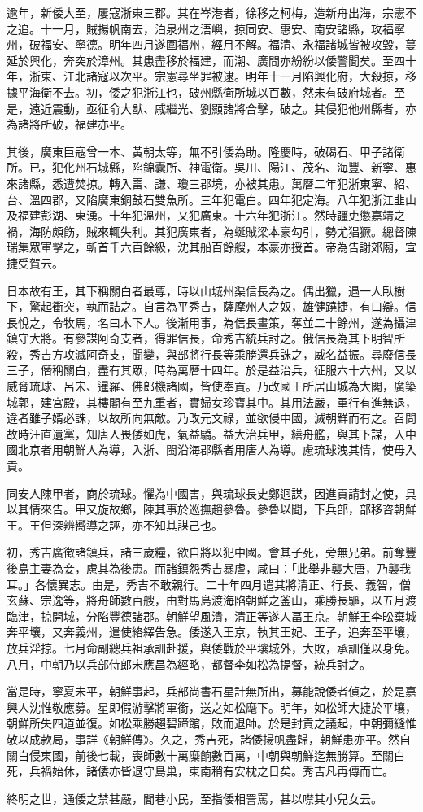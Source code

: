 \begin{pinyinscope}
逾年，新倭大至，屢寇浙東三郡。其在岑港者，徐移之柯梅，造新舟出海，宗憲不之追。十一月，賊揚帆南去，泊泉州之浯嶼，掠同安、惠安、南安諸縣，攻福寧州，破福安、寧德。明年四月遂圍福州，經月不解。福清、永福諸城皆被攻毀，蔓延於興化，奔突於漳州。其患盡移於福建，而潮、廣間亦紛紛以倭警聞矣。至四十年，浙東、江北諸寇以次平。宗憲尋坐罪被逮。明年十一月陷興化府，大殺掠，移據平海衛不去。初，倭之犯浙江也，破州縣衛所城以百數，然未有破府城者。至是，遠近震動，亟征俞大猷、戚繼光、劉顯諸將合擊，破之。其侵犯他州縣者，亦為諸將所破，福建亦平。

其後，廣東巨寇曾一本、黃朝太等，無不引倭為助。隆慶時，破碣石、甲子諸衛所。已，犯化州石城縣，陷錦囊所、神電衛。吳川、陽江、茂名、海豐、新寧、惠來諸縣，悉遭焚掠。轉入雷、謙、瓊三郡境，亦被其患。萬曆二年犯浙東寧、紹、台、溫四郡，又陷廣東銅鼓石雙魚所。三年犯電白。四年犯定海。八年犯浙江韭山及福建彭湖、東湧。十年犯溫州，又犯廣東。十六年犯浙江。然時疆吏懲嘉靖之禍，海防頗飭，賊來輒失利。其犯廣東者，為蜒賊梁本豪勾引，勢尤猖獗。總督陳瑞集眾軍擊之，斬首千六百餘級，沈其船百餘艘，本豪亦授首。帝為告謝郊廟，宣捷受賀云。

日本故有王，其下稱關白者最尊，時以山城州渠信長為之。偶出獵，遇一人臥樹下，驚起衝突，執而詰之。自言為平秀吉，薩摩州人之奴，雄健蹺捷，有口辯。信長悅之，令牧馬，名曰木下人。後漸用事，為信長畫策，奪並二十餘州，遂為攝津鎮守大將。有參謀阿奇支者，得罪信長，命秀吉統兵討之。俄信長為其下明智所殺，秀吉方攻滅阿奇支，聞變，與部將行長等乘勝還兵誅之，威名益振。尋廢信長三子，僭稱關白，盡有其眾，時為萬曆十四年。於是益治兵，征服六十六州，又以威脅琉球、呂宋、暹羅、佛郎機諸國，皆使奉貢。乃改國王所居山城為大閣，廣築城郭，建宮殿，其樓閣有至九重者，實婦女珍寶其中。其用法嚴，軍行有進無退，違者雖子婿必誅，以故所向無敵。乃改元文祿，並欲侵中國，滅朝鮮而有之。召問故時汪直遺黨，知唐人畏倭如虎，氣益驕。益大治兵甲，繕舟艦，與其下謀，入中國北京者用朝鮮人為導，入浙、閩沿海郡縣者用唐人為導。慮琉球洩其情，使毋入貢。

同安人陳甲者，商於琉球。懼為中國害，與琉球長史鄭迥謀，因進貢請封之使，具以其情來告。甲又旋故鄉，陳其事於巡撫趙參魯。參魯以聞，下兵部，部移咨朝鮮王。王但深辨嚮導之誣，亦不知其謀己也。

初，秀吉廣徵諸鎮兵，諸三歲糧，欲自將以犯中國。會其子死，旁無兄弟。前奪豐後島主妻為妾，慮其為後患。而諸鎮怨秀吉暴虐，咸曰：「此舉非襲大唐，乃襲我耳。」各懷異志。由是，秀吉不敢親行。二十年四月遣其將清正、行長、義智，僧玄蘇、宗逸等，將舟師數百艘，由對馬島渡海陷朝鮮之釜山，乘勝長驅，以五月渡臨津，掠開城，分陷豐德諸郡。朝鮮望風潰，清正等遂人畐王京。朝鮮王李昖棄城奔平壤，又奔義州，遣使絡繹告急。倭遂入王京，執其王妃、王子，追奔至平壤，放兵淫掠。七月命副總兵祖承訓赴援，與倭戰於平壤城外，大敗，承訓僅以身免。八月，中朝乃以兵部侍郎宋應昌為經略，都督李如松為提督，統兵討之。

當是時，寧夏未平，朝鮮事起，兵部尚書石星計無所出，募能說倭者偵之，於是嘉興人沈惟敬應募。星即假游擊將軍銜，送之如松麾下。明年，如松師大捷於平壤，朝鮮所失四道並復。如松乘勝趨碧蹄館，敗而退師。於是封貢之議起，中朝彌縫惟敬以成款局，事詳《朝鮮傳》。久之，秀吉死，諸倭揚帆盡歸，朝鮮患亦平。然自關白侵東國，前後七載，喪師數十萬糜餉數百萬，中朝與朝鮮迄無勝算。至關白死，兵禍始休，諸倭亦皆退守島巢，東南稍有安枕之日矣。秀吉凡再傳而亡。

終明之世，通倭之禁甚嚴，閭巷小民，至指倭相詈罵，甚以噤其小兒女云。


\end{pinyinscope}